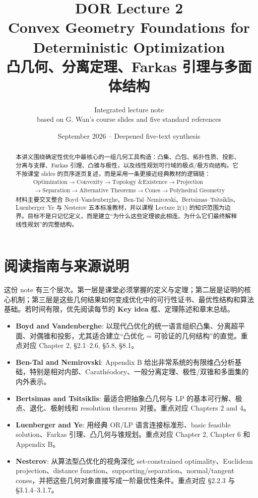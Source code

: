 \documentclass[11pt,a4paper,openany]{ctexrep}
\title{\Huge DOR Lecture 2\\[0.4em]
\LARGE Convex Geometry Foundations for Deterministic Optimization\\[0.8em]
\large 凸几何、分离定理、Farkas 引理与多面体结构}
\author{Integrated lecture note\\
\small based on G. Wan's course slides and five standard references}
\date{September 2026 -- Deepened five-text synthesis}
\theoremstyle{definition}
\begin{document}
\maketitle

\begin{abstract}
本讲义围绕确定性优化中最核心的一组几何工具构造：凸集、凸包、拓扑性质、投影、分离与支撑、Farkas 引理、凸锥与极性，以及线性规划可行域的极点/极方向结构。它不按课堂 slides 的页序逐页复述，而是采用一条更接近经典教材的逻辑链：
\[
\boxed{\begin{gathered}
\text{Optimization}\to\text{Convexity}\to\text{Topology \& Existence}\to\text{Projection}\\
\to\text{Separation}\to\text{Alternative Theorems}\to\text{Cones}\to\text{Polyhedral Geometry}
\end{gathered}}
\]
材料主要交叉整合 Boyd--Vandenberghe、Ben-Tal--Nemirovski、Bertsimas--Tsitsiklis、Luenberger--Ye 与 Nesterov 五本标准教材，并以课程 Lecture 2(1) 的知识范围为边界。目标不是只记忆定义，而是建立“为什么这些定理彼此相连、为什么它们最终解释线性规划”的完整结构。
\end{abstract}

\tableofcontents
\clearpage

\chapter*{阅读指南与来源说明}

这份 note 有三个层次。第一层是课堂必须掌握的定义与定理；第二层是证明的核心机制；第三层是这些几何结果如何变成优化中的可行性证书、最优性结构和算法基础。若时间有限，优先阅读每节的 \textbf{Key idea} 框、定理陈述和章末总结。

\begin{sourcebox}[五本参考书在本讲中的角色]
\begin{itemize}[leftmargin=2em]
  \item \textbf{Boyd and Vandenberghe}: 以现代凸优化的统一语言组织凸集、分离超平面、对偶锥和投影，尤其适合建立“凸优化 = 可验证的几何结构”的直觉。重点对应 Chapter 2, \S2.1--2.6, \S5.8, \S8.1。\cite{boyd}
  \item \textbf{Ben-Tal and Nemirovski}: Appendix B 给出非常系统的有限维凸分析基础，特别是相对内部、Carath\'eodory、一般分离定理、极性/双锥和多面集的内外表示。\cite{bental}
  \item \textbf{Bertsimas and Tsitsiklis}: 最适合把抽象凸几何与 LP 的基本可行解、极点、退化、极射线和 resolution theorem 对接。重点对应 Chapters 2 and 4。\cite{bertsimas}
  \item \textbf{Luenberger and Ye}: 用经典 OR/LP 语言连接标准形、basic feasible solution、Farkas 引理、凸几何与锥规划。重点对应 Chapter 2, Chapter 6 和 Appendix B。\cite{luenberger}
  \item \textbf{Nesterov}: 从算法型凸优化的视角深化 set-constrained optimality、Euclidean projection、distance function、supporting/separation、normal/tangent cones，并把这些几何对象直接写成一阶最优性条件。重点对应 \S2.2.3 与 \S3.1.4--3.1.7。\cite{nesterov}
\end{itemize}
\end{sourcebox}
\end{document}
